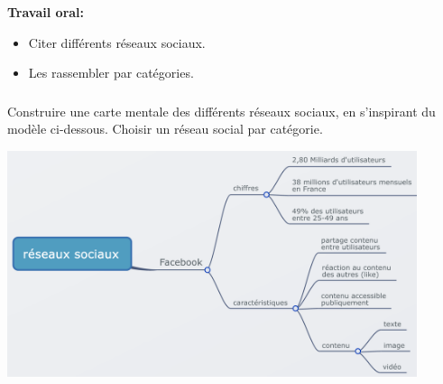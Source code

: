 \documentclass[svgnames,11pt]{beamer}
\begin{document}
\begin{frame}
    \frametitle{}

    \begin{activite}
    \textbf{Travail oral:} 
    \begin{itemize}
        \item Citer différents réseaux sociaux.
        \item Les rassembler par catégories.
    \end{itemize}
    \end{activite}

\end{frame}
\begin{frame}
    \frametitle{}
    \begin{activite}
        Construire une carte mentale des différents réseaux sociaux, en s'inspirant du modèle ci-dessous. Choisir un réseau social par catégorie.
        \begin{center}
            \centering
            \includegraphics[width=12cm]{ressources/carte-mentale.png}
        \end{center}
        \end{activite}
    

\end{frame}
\end{document}

